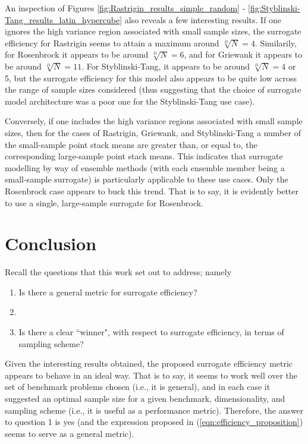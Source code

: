 \documentclass[conference]{IEEEtran}
\begin{document}
An inspection of Figures \ref{fig:Rastrigin_results_simple_random} - \ref{fig:Styblinski-Tang_results_latin_hypercube} also reveals a few interesting results. If one ignores the high variance region associated with small sample sizes, the surrogate efficiency for Rastrigin seems to attain a maximum around $\sqrt[D]{N} = 4$. Similarily, for Rosenbrock it appears to be around $\sqrt[D]{N} = 6$, and for Griewank it appears to be around $\sqrt[D]{N} = 11$. For Styblinski-Tang, it appears to be around $\sqrt[D]{N} = 4$ or 5, but the surrogate efficiency for this model also appears to be quite low across the range of sample sizes considered (thus suggesting that the choice of surrogate model architecture was a poor one for the Styblinski-Tang use case).

Conversely, if one includes the high variance regions associated with small sample sizes, then for the cases of Rastrigin, Griewank, and Styblinski-Tang a number of the small-sample point stack means are greater than, or equal to, the corresponding large-sample point stack means. This indicates that surrogate modelling by way of ensemble methods (with each ensemble member being a small-sample surrogate) is particularly applicable to these use cases. Only the Rosenbrock case appears to buck this trend. That is to say, it is evidently better to use a single, large-sample surrogate for Rosenbrock.

\section{Conclusion}

Recall the questions that this work set out to address; namely

\begin{enumerate}
	\item Is there a general metric for surrogate efficiency?
	\item []
	\item Is there a clear ``winner", with respect to surrogate efficiency, in terms of sampling scheme?
\end{enumerate}

Given the interesting results obtained, the proposed surrogate efficiency metric appears to behave in an ideal way. That is to say, it seems to work well over the set of benchmark problems chosen (i.e., it is general), and in each case it suggested an optimal sample size for a given benchmark, dimensionality, and sampling scheme (i.e., it is useful as a performance metric). Therefore, the answer to question 1 is yes (and the expression proposed in (\ref{eqn:efficiency_proposition}) seems to serve as a general metric).
\end{document}
